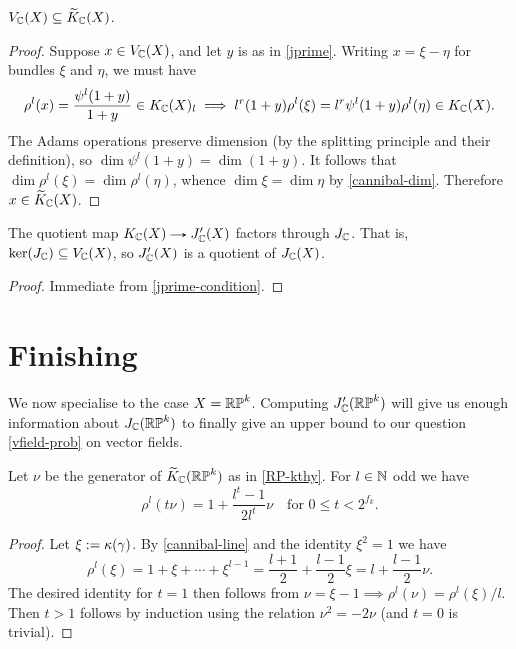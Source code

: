 \begin{lemma}
  \label{jprime-dim}
  $V_{\mathbb{C}}(X) \subseteq \widetilde K_{\mathbb{C}}(X)$.
\end{lemma}

\begin{proof}
  Suppose $x \in V_{\mathbb{C}}(X)$, and let $y$ is as in \eqref{jprime}. Writing
  $x = \xi - \eta$ for bundles $\xi$ and $\eta$, we must have
  \[
  \rho^l(x) = \frac{\psi^l(1+y)}{1+y} \in K_{\mathbb{C}}(X)_l \implies
  l^r(1+y)\rho^l(\xi) = l^r\psi^l(1+y)\rho^l(\eta) \in K_{\mathbb{C}}(X).
  \]
  The Adams operations preserve dimension (by the splitting principle
  and their definition), so $\dim \psi^l(1+y) = \dim {(1+y)}$. It
  follows that $\dim \rho^l(\xi) = \dim \rho^l(\eta)$, whence $\dim
  \xi = \dim \eta$ by \eqref{cannibal-dim}. Therefore $x \in
  \widetilde K_{\mathbb{C}}(X)$.
\end{proof}

\begin{proposition}
  \label{jprime-bound}
  The quotient map $K_\C(X) \to J_\C'(X)$ factors through
  $J_{\mathbb{C}}$. That is, $\ker(J_{\mathbb{C}}) \subseteq V_{\mathbb{C}}(X)$, so $J_{\mathbb{C}}'(X)$
  is a quotient of $J_{\mathbb{C}}(X)$.
\end{proposition}

\begin{proof}
  Immediate from \eqref{jprime-condition}.
\end{proof}


\section{Finishing}

We now specialise to the case $X = \mathbb{RP}^k$. Computing $J_{\mathbb{C}}'(\mathbb{RP}^k)$
will give us enough information about $J_{\mathbb{C}}(\mathbb{RP}^k)$ to finally give
an upper bound to our question \eqref{vfield-prob} on vector fields.

\begin{lemma}
  \label{RP-cannibal}
  Let $\nu$ be the generator of $\widetilde K_{\mathbb{C}}(\mathbb{RP}^k)$ as in
  \eqref{RP-kthy}. For $l \in \mathbb{N}$ odd we have
  \[
  \rho^l(t\nu) = 1 + \frac{l^t-1}{2l^t}\nu \quad\text{for }0 \le t <
  2^{f_k}.
  \]
\end{lemma}

\begin{proof}
  Let $\xi \mathrel{:=} \kappa(\gamma)$. By \eqref{cannibal-line} and the
  identity $\xi^2 = 1$ we have
  \[
  \rho^l(\xi) = 1 + \xi + \cdots + \xi^{l-1} = \frac{l+1}2 +
  \frac{l-1}2\xi = l + \frac{l-1}{2}\nu.
  \]
  The desired identity for $t=1$ then follows from $\nu = \xi - 1
  \implies \rho^l(\nu) = \rho^l(\xi)/l$. Then $t > 1$ follows by
  induction using the relation $\nu^2 = -2\nu$ (and $t=0$ is trivial).
\end{proof}

